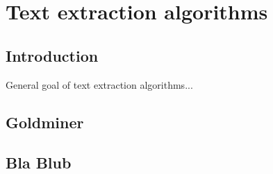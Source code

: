 
\chapter{Text extraction algorithms} %

\label{Chapter2} %



\section{Introduction}

General goal of text extraction algorithms...

\section{Goldminer}
\section{Bla Blub}

